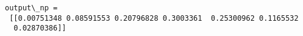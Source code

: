 \documentclass[11pt]{article}
\makeatletter
\newcommand{\boxspacing}{\kern\kvtcb@left@rule\kern\kvtcb@boxsep}
\newcommand{\prompt}[4]{
        {\ttfamily\llap{{\color{#2}[#3]:\hspace{3pt}#4}}\vspace{-\baselineskip}}
    }
\makeatother
\begin{document}
    \begin{Verbatim}[commandchars=\\\{\}]
output\_np =
 [[0.00751348 0.08591553 0.20796828 0.3003361  0.25300962 0.1165532
  0.02870386]]
    \end{Verbatim}

    \begin{center}
    \end{center}
    { \hspace*{\fill} \\}
    
    \begin{tcolorbox}[breakable, size=fbox, boxrule=1pt, pad at break*=1mm,colback=cellbackground, colframe=cellborder]
\prompt{In}{incolor}{ }{\boxspacing}
\begin{Verbatim}[commandchars=\\\{\}]

\end{Verbatim}
\end{tcolorbox}


    
    
    
\end{document}
